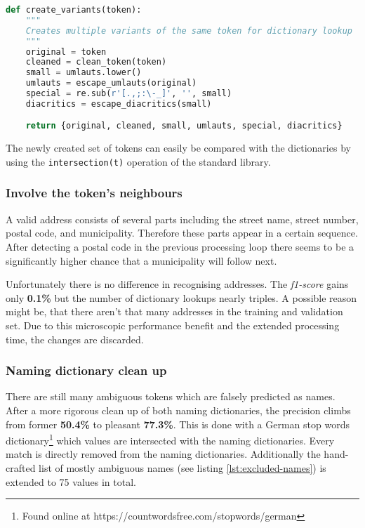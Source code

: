 \begin{lstlisting}[language=Python, label={code:regex-variants}, caption=Creating different variants of a single token]
def create_variants(token):
    """
    Creates multiple variants of the same token for dictionary lookup
    """
    original = token
    cleaned = clean_token(token)
    small = umlauts.lower()
    umlauts = escape_umlauts(original)
    special = re.sub(r'[.,;:\-_]', '', small)
    diacritics = escape_diacritics(small)

    return {original, cleaned, small, umlauts, special, diacritics}
\end{lstlisting}

The newly created set of tokens can easily be compared with the dictionaries by using the \verb|intersection(t)| operation of the standard library.

\subsubsection{Involve the token's neighbours}

A valid address consists of several parts including the street name, street number, postal code, and municipality. Therefore these parts appear in a certain sequence. After detecting a postal code in the previous processing loop there seems to be a significantly higher chance that a municipality will follow next.

Unfortunately there is no difference in recognising addresses. The \emph{f1-score} gains only \textbf{0.1\%} but the number of dictionary lookups nearly triples. A possible reason might be, that there aren't that many addresses in the training and validation set. Due to this microscopic performance benefit and the extended processing time, the changes are discarded.

\subsubsection{Naming dictionary clean up}

There are still many ambiguous tokens which are falsely predicted as names. After a more rigorous clean up of both naming dictionaries, the precision climbs from former \textbf{50.4\%} to pleasant \textbf{77.3\%}. This is done with a German stop words dictionary\footnote{Found online at https://countwordsfree.com/stopwords/german} which values are intersected with the naming dictionaries. Every match is directly removed from the naming dictionaries. Additionally the hand-crafted list of mostly ambiguous names (see listing \ref{lst:excluded-names}) is extended to 75 values in total.

